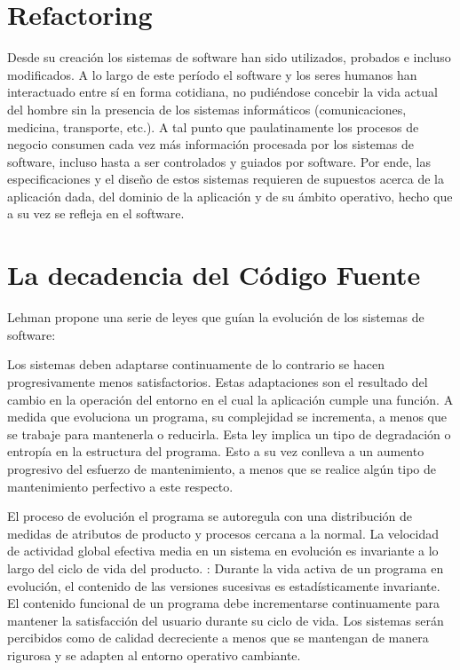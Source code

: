 \section{Refactoring}
Desde su creación los sistemas de software han sido utilizados, probados
e incluso modificados. A lo largo de este período el software y los seres humanos
han interactuado entre sí en forma cotidiana, no pudiéndose concebir
la vida actual del hombre sin la presencia de los sistemas informáticos (comunicaciones,
medicina, transporte, etc.). A tal punto que paulatinamente
los procesos de negocio consumen cada vez más información procesada por
los sistemas de software, incluso hasta a ser controlados y guiados por software.
Por ende, las especificaciones y el diseño de estos sistemas requieren
de supuestos acerca de la aplicación dada, del dominio de la aplicación y de
su ámbito operativo, hecho que a su vez se refleja en el software.


\section{La decadencia del Código Fuente}
Lehman \cite{REF02} \cite{REF01} propone una serie de leyes que guían la evolución de los
sistemas de software:


\begin{enumerate}[label=\textbf{\arabic*}.]
	 Los sistemas deben adaptarse continuamente de
	lo contrario se hacen progresivamente menos satisfactorios. Estas adaptaciones
	son el resultado del cambio en la operación del entorno en el
	cual la aplicación cumple una función.
	 A medida que evoluciona un programa,
	su complejidad se incrementa, a menos que se trabaje para mantenerla
	o reducirla. Esta ley implica un tipo de degradación o entropía en la
	estructura del programa. Esto a su vez conlleva a un aumento progresivo
	del esfuerzo de mantenimiento, a menos que se realice algún tipo
	de mantenimiento perfectivo a este respecto.

	 El proceso de evolución el programa se autoregula
	con una distribución de medidas de atributos de producto y procesos
	cercana a la normal.
	 La velocidad de
	actividad global efectiva media en un sistema en evolución es invariante
	a lo largo del ciclo de vida del producto.
	: Durante la vida activa de un
	programa en evolución, el contenido de las versiones sucesivas es estadísticamente
	invariante.
	 El contenido funcional de un programa
	debe incrementarse continuamente para mantener la satisfacción del
	usuario durante su ciclo de vida.
	 Los sistemas serán percibidos como de calidad
	decreciente a menos que se mantengan de manera rigurosa y se adapten
	al entorno operativo cambiante.
\end{enumerate}

